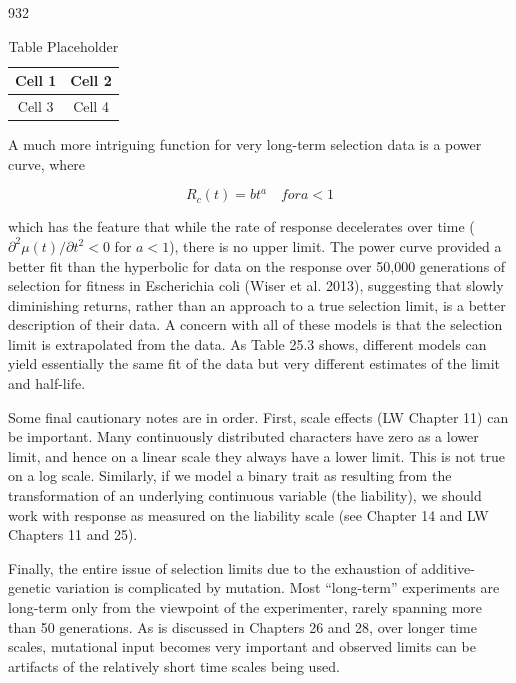 \documentclass{article}
\begin{document}
932

\begin{table}[h]
\centering
\begin{tabular}{|c|c|}
\hline
Cell 1 & Cell 2 \\
\hline
Cell 3 & Cell 4 \\
\hline
\end{tabular}
\caption{Table Placeholder}
\end{table}

A much more intriguing function for very long-term selection data is a power curve, where

\begin{equation}
R_{c}(t)=b t^{a}\quad for a<1
\tag{25.11b}
\label{eq:25_11b}
\end{equation}

which has the feature that while the rate of response decelerates over time ( $ \partial^2 \mu(t) / \partial t^2 < 0 $ for  $ a < 1 $), there is no upper limit. The power curve provided a better fit than the hyperbolic for data on the response over 50,000 generations of selection for fitness in Escherichia coli (Wiser et al. 2013), suggesting that slowly diminishing returns, rather than an approach to a true selection limit, is a better description of their data. A concern with all of these models is that the selection limit is extrapolated from the data. As Table 25.3 shows, different models can yield essentially the same fit of the data but very different estimates of the limit and half-life.

Some final cautionary notes are in order. First, scale effects (LW Chapter 11) can be important. Many continuously distributed characters have zero as a lower limit, and hence on a linear scale they always have a lower limit. This is not true on a log scale. Similarly, if we model a binary trait as resulting from the transformation of an underlying continuous variable (the liability), we should work with response as measured on the liability scale (see Chapter 14 and LW Chapters 11 and 25).

Finally, the entire issue of selection limits due to the exhaustion of additive-genetic variation is complicated by mutation. Most “long-term” experiments are long-term only from the viewpoint of the experimenter, rarely spanning more than 50 generations. As is discussed in Chapters 26 and 28, over longer time scales, mutational input becomes very important and observed limits can be artifacts of the relatively short time scales being used.
\end{document}
